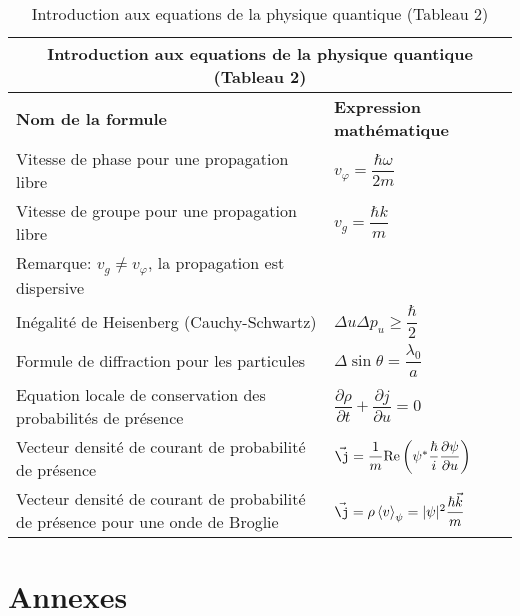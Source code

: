 \documentclass[10pt,a4paper,titlepage,portrait]{article}
\newcommand*{\dpv}[2]
{
    \dfrac{\partial#1}{\partial#2}
}
\renewcommand{\arraystretch}{2}
\newcommand{\av}[2]
{
    \left\langle#1\right\rangle_{#2}
}
\begin{document}
\newpage 
\begin{table}[H]
    \centering
    \renewcommand{\arraystretch}{1.5} %
    \setlength{\tabcolsep}{8pt} %
    \begin{tabular}{@{}p{9cm}p{10cm}@{}}
        \toprule
        \multicolumn{2}{c}{\textbf{Introduction aux equations de la physique quantique (Tableau 2)}} \\
        \midrule
        \textbf{Nom de la formule} & \textbf{Expression mathématique} \\
        \midrule

    Vitesse de phase pour une propagation libre & $v_{\varphi} = \dfrac{\hbar \omega}{2m}$ \\
    Vitesse de groupe pour une propagation libre & $v_g = \dfrac{\hbar k}{m}$ \\
    Remarque: $v_g \neq v_\varphi$, la propagation est dispersive & \\ 
    Inégalité de Heisenberg (Cauchy-Schwartz) & $\Delta u \Delta p_u \geqslant \dfrac{\hbar}{2}$ \\
    Formule de diffraction pour les particules & $\Delta \sin\theta = \dfrac{\lambda_0}{a}$ \\
    Equation locale de conservation des probabilités de présence & $\dpv{\rho}{t} + \dpv{j}{u} = 0 $ \\
    Vecteur densité de courant de probabilité de présence & $\vec {\j} = \dfrac{1}{m}\mathrm{Re}\left(\psi^*\dfrac{\hbar}{i} \dpv{\psi}{u} \right)$ \\
    Vecteur densité de courant de probabilité de présence pour une onde de Broglie & $\vec {\j} = \rho \av{v}{\psi} = |\psi|^2 \dfrac{\hbar \vec k}{m}$ \\

\bottomrule
\end{tabular}
\caption{Introduction aux equations de la physique quantique (Tableau 2)}
\label{tab:quantphis}
\end{table}

\section{Annexes}
\end{document}
